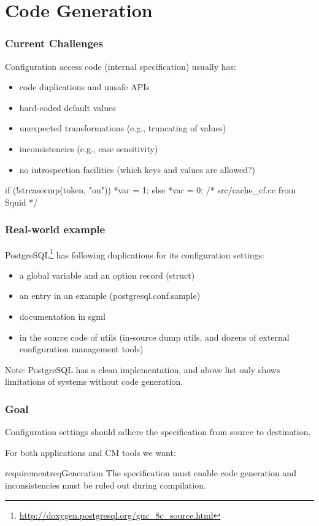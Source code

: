 \section{Code Generation}

\begin{frame}[fragile]
	\frametitle{Current Challenges}
	Configuration access code (internal specification) usually has:

	\begin{itemize}
	\item code duplications and unsafe APIs
	\item hard-coded default values
	\item unexpected transformations (e.g., truncating of values)
	\item inconsistencies (e.g., case sensitivity)
	\item no introspection facilities (which keys and values are allowed?)
	\end{itemize}
	\begin{example}
	\begin{code}[gobble=4,language=C++]
	if (!strcasecmp(token, "on")) {
		*var = 1;
	} else {
		*var = 0;
	} /* src/cache_cf.cc from Squid */
	\end{code}\end{example}
\end{frame}

\begin{frame}[fragile]
	\frametitle{Real-world example}
	PostgreSQL\footnote{\url{http://doxygen.postgresql.org/guc_8c_source.html}} has following duplications for its configuration settings:
	\begin{itemize}
	\item a global variable and an option record (struct)
	\item an entry in an example (postgresql.conf.sample)
	\item documentation in sgml
	\item in the source code of utils (in-source dump utils, and dozens of external configuration management tools)
	\end{itemize}
	\pause
	\vspace{1em}
	Note: PostgreSQL has a clean implementation, and above list only shows limitations of systems without code generation.
\end{frame}

\begin{frame}
	\frametitle{Goal}

	\begin{goal}
	Configuration settings should adhere the specification from source to destination.
	\end{goal}

	For both applications and CM tools we want:

	\begin{restatable}{requirement}{reqGeneration}
	The specification must enable code generation and inconsistencies must be ruled out during compilation.
	\end{restatable}
\end{frame}

